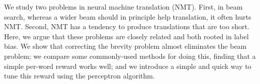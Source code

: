 We study two problems in neural machine translation (NMT). First, in beam search, whereas a wider beam should in principle help translation, it often hurts NMT. Second, NMT has a tendency to produce translations that are too short. Here, we argue that these problems are closely related and both rooted in label bias. We show that correcting the brevity problem almost eliminates the beam problem; we  compare some commonly-used methods for doing this, finding that a simple per-word reward works well; and we introduce a simple and quick way to tune this reward using the perceptron algorithm.
